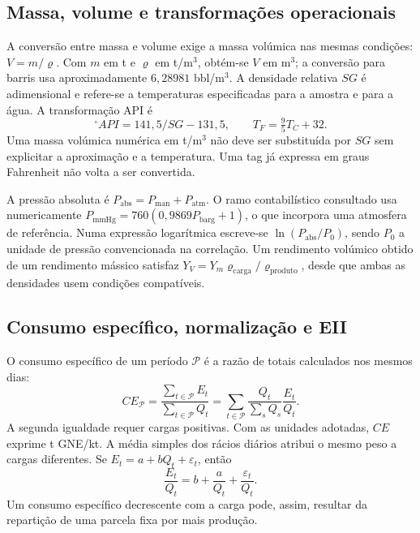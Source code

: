 \subsection{Massa, volume e transformações operacionais}
\label{sec:mat-transformacoes}
A conversão entre massa e volume exige a massa volúmica nas mesmas condições: $V=m/\varrho$. Com $m$ em t e $\varrho$ em t/m$^3$, obtém-se $V$ em m$^3$; a conversão para barris usa aproximadamente $6{,}28981$ bbl/m$^3$. A densidade relativa $SG$ é adimensional e refere-se a temperaturas especificadas para a amostra e para a água. A transformação API é
\begin{equation}
{}^{\circ}\!API=141{,}5/SG-131{,}5,
\qquad T_F=\tfrac95T_C+32.
\label{eq:mat-api-temperatura}
\end{equation}
Uma massa volúmica numérica em t/m$^3$ não deve ser substituída por $SG$ sem explicitar a aproximação e a temperatura. Uma tag já expressa em graus Fahrenheit não volta a ser convertida.

A pressão absoluta é $P_{\mathrm{abs}}=P_{\mathrm{man}}+P_{\mathrm{atm}}$. O ramo contabilístico consultado usa numericamente $P_{\mathrm{mmHg}}=760(0{,}9869P_{\mathrm{barg}}+1)$, o que incorpora uma atmosfera de referência. Numa expressão logarítmica escreve-se $\ln(P_{\mathrm{abs}}/P_0)$, sendo $P_0$ a unidade de pressão convencionada na correlação. Um rendimento volúmico obtido de um rendimento mássico satisfaz $Y_V=Y_m\varrho_{\mathrm{carga}}/\varrho_{\mathrm{produto}}$, desde que ambas as densidades usem condições compatíveis.

\subsection{Consumo específico, normalização e EII}
\label{sec:mat-indicadores}
O consumo específico de um período $\mathcal P$ é a razão de totais calculados nos mesmos dias:
\begin{equation}
CE_{\mathcal P}=\frac{\sum_{t\in\mathcal P}E_t}{\sum_{t\in\mathcal P}Q_t}
=\sum_{t\in\mathcal P}\frac{Q_t}{\sum_sQ_s}\frac{E_t}{Q_t}.
\label{eq:mat-consumo-especifico}
\end{equation}
A segunda igualdade requer cargas positivas. Com as unidades adotadas, $CE$ exprime t GNE/kt. A média simples dos rácios diários atribui o mesmo peso a cargas diferentes. Se $E_t=a+bQ_t+\varepsilon_t$, então
\begin{equation}
\frac{E_t}{Q_t}=b+\frac{a}{Q_t}+\frac{\varepsilon_t}{Q_t}.
\label{eq:mat-racio-carga}
\end{equation}
Um consumo específico decrescente com a carga pode, assim, resultar da repartição de uma parcela fixa por mais produção.

